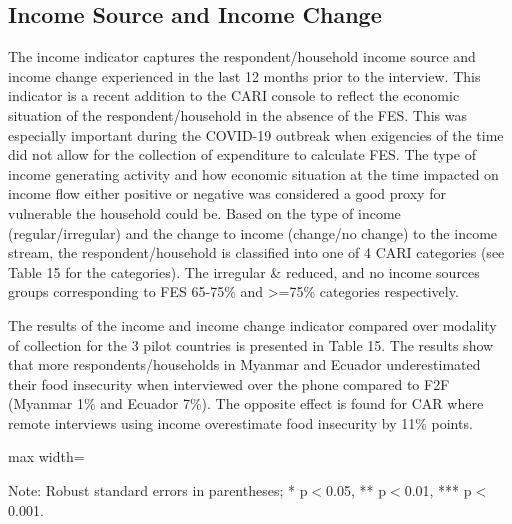 \documentclass[11pt,harvard]{article}
\begin{document}
\pagebreak

\subsection{Income Source and Income Change}

The income indicator captures the respondent/household income source and income change experienced in the last 12 months prior to the interview. This indicator is a recent addition to the CARI console to reflect the economic situation of the respondent/household in the absence of the FES. This was especially important during the COVID-19 outbreak when exigencies of the time did not allow for the collection of expenditure to calculate FES. The type of income generating activity and how economic situation at the time impacted on income flow either positive or negative was considered a good proxy for vulnerable the household could be. Based on the type of income (regular/irregular) and the change to income (change/no change) to the income stream, the respondent/household is classified into one of 4 CARI categories (see Table 15 for the categories). The irregular \& reduced, and no income sources groups corresponding to FES 65-75\% and >=75\% categories respectively.

The results of the income and income change indicator compared over modality of collection for the 3 pilot countries is presented in Table 15. The results show that more respondents/households in Myanmar and Ecuador underestimated their food insecurity when interviewed over the phone compared to F2F (Myanmar 1\% and Ecuador 7\%). The opposite effect is found for CAR where remote interviews using income overestimate food insecurity by 11\% points.    

\begin{table}[htbp]
	\centering
	\begin{adjustbox}{max width=\textwidth}
		\begin{threeparttable}
			\caption{Impact of Survey Modality on Income}
			\scriptsize
			 
			\label{tab:INC_Modality_All_Country}
			\begin{tablenotes}
				\item Note: Robust standard errors in parentheses; * p$<$0.05, ** p$<$0.01, *** p$<$0.001. 
			\end{tablenotes}
		\end{threeparttable}
	\end{adjustbox}
\end{table}
\end{document}
